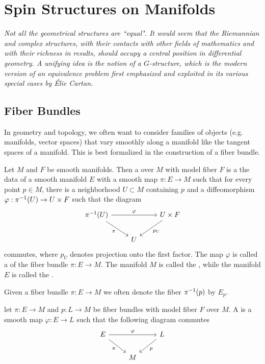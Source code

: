 \chapter{Spin Structures on Manifolds}
%
\subsectionend $ $\\
%
\emph{Not all the geometrical structures are ``equal". It would seem that the
Riemannian and complex structures, with their contacts with other fields of
mathematics and with their richness in results, should occupy a central position
in differential geometry. A unifying idea is the notion of a $G$-structure, which
is the modern version of an equivalence problem first emphasized and exploited
in its various special cases by \'Elie Cartan.} \\
%
%
\subsectionend
%
\section{Fiber Bundles}
%
In geometry and topology, we often want to consider families of objects
(e.g. manifolds, vector spaces) that vary smoothly along a manifold like
the tangent spaces of a manifold. This is best formalized in the construction
of a fiber bundle.
%
\begin{defn}
Let $M$ and $F$ be smooth manifolds. Then a  over $M$ with
model fiber $F$ is a the data of a smooth manifold $E$ with a smooth map
$\pi : E \to M$ such that for every point $p \in M$, there is a neighborhood
$U \subset M$ containing $p$ and a diffeomorphism
$\varphi : \pi^{-1}(U) \to U \times F$ such that the diagram
\[\begin{tikzcd}
\pi\inv(U) \ar[rr, "\varphi"] \ar[dr, "\pi"']&& U \times F \ar[dl, "p_U"] \\
& U
\end{tikzcd}\]
commutes, where $p_U$ denotes projection onto the first factor. The map $\varphi$ is
called a  of the fiber bundle $\pi : E \to M$. The
manifold $M$ is called the , while the manifold $E$ is
called the .
\end{defn}
%
Given a fiber bundle $\pi : E \to M$ we often denote the fiber $\pi^{-1}(p)$
by $E_p$.
%
\begin{defn}
let $\pi : E \to M$ and $p : L \to M$ be fiber bundles with model fiber $F$
over $M$. A  is a smooth map $\varphi : E \to L$ such
that the following diagram commutes
\[\begin{tikzcd}
E \ar[dr, "\pi"']\ar[rr,"\varphi"] & & L \ar[dl, "p"] \\
& M
\end{tikzcd}\]
\end{defn}
